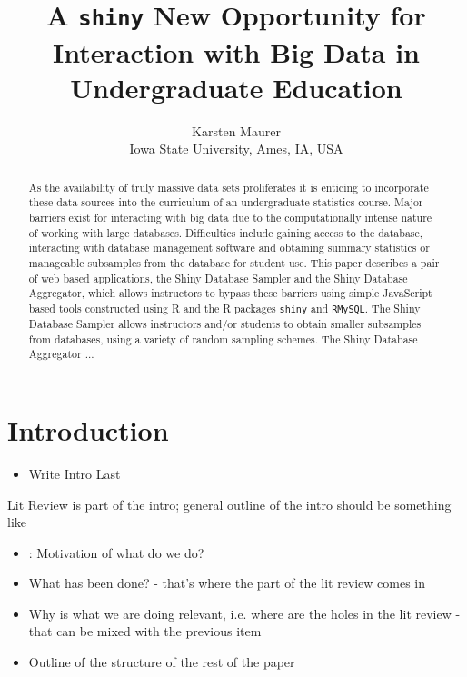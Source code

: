 \documentclass{article}\usepackage[]{graphicx}\usepackage[]{color}
\newcommand{\hh}[1]{{\color{ForestGreen} #1}}
\begin{document}
\tableofcontents
\newpage





\title{A \texttt{shiny} New Opportunity for Interaction with Big Data in Undergraduate Education}
\author{Karsten Maurer \\ Iowa State University, Ames, IA, USA}

\maketitle



 \begin{abstract}
As the availability of truly massive data sets proliferates it is enticing to incorporate these data sources into the curriculum of an undergraduate statistics course.  Major barriers exist for interacting with big data due to the computationally intense nature of working with large databases.  Difficulties include gaining access to the database, interacting with database management software and obtaining summary statistics or manageable subsamples from the database for student use.  This paper describes a pair of web based applications, the Shiny Database Sampler and the Shiny Database Aggregator, which allows instructors to bypass these barriers using simple JavaScript based tools constructed using R and the R packages \texttt{shiny} and \texttt{RMySQL}. The Shiny Database Sampler allows instructors and/or students to obtain smaller subsamples from databases, using a variety of random sampling schemes. The Shiny Database Aggregator ...
 \end{abstract}

\section{Introduction}
\begin{itemize}
\item Write Intro Last
\end{itemize}

\hh{Lit Review is part of the intro; general outline of the intro should be something like
\begin{itemize}
\item: Motivation of what do we do?
\item What has been done? - that's where the part of the lit review comes in
\item Why is what we are doing relevant, i.e. where are the holes in the lit review - that can be mixed with the previous item
\item Outline of the structure of the rest of the paper
\end{itemize}}
\end{document}
